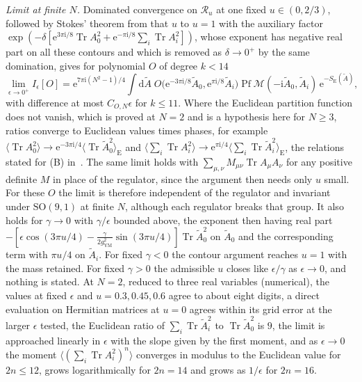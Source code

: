 \emph{Limit at finite \(N\).} Dominated convergence on \(\mathcal R_u\) at one fixed \(u\in(0,2/3)\), followed by Stokes' theorem from that \(u\) to \(u=1\) with the auxiliary factor \(\exp(-\delta[\mathrm e^{3\pi\mathrm i/8}\operatorname{Tr}A_0^2+\mathrm e^{-\pi\mathrm i/8}\sum_i\operatorname{Tr}A_i^2])\), whose exponent has negative real part on all these contours and which is removed as \(\delta\to0^+\) by the same domination, gives for polynomial \(O\) of degree \(k<14\)
\[
\lim_{\epsilon\to0^+}I_\epsilon[O]=\mathrm e^{7\pi\mathrm i(N^2-1)/4}\int\mathrm d\tilde A\;O\bigl(\mathrm e^{-3\pi\mathrm i/8}\tilde A_0,\mathrm e^{\pi\mathrm i/8}\tilde A_i\bigr)\operatorname{Pf}\mathcal M(-\mathrm i\tilde A_0,\tilde A_i)\,\mathrm e^{-S_{\mathrm E}(\tilde A)},
\]
with difference at most \(C_{O,N}\epsilon\) for \(k\le11\). Where the Euclidean partition function does not vanish, which is proved at \(N=2\) and is a hypothesis here for \(N\ge3\), ratios converge to Euclidean values times phases, for example \(\langle\operatorname{Tr}A_0^2\rangle\to\mathrm e^{-3\pi\mathrm i/4}\langle\operatorname{Tr}\tilde A_0^2\rangle_{\mathrm E}\) and \(\langle\sum_i\operatorname{Tr}A_i^2\rangle\to\mathrm e^{\pi\mathrm i/4}\langle\sum_i\operatorname{Tr}\tilde A_i^2\rangle_{\mathrm E}\), the relations stated for (B) in~\cite{Anagnostopoulos2026}. The same limit holds with \(\sum_{\mu,\nu}M_{\mu\nu}\operatorname{Tr}A_\mu A_\nu\) for any positive definite \(M\) in place of the regulator, since the argument then needs only \(u\) small. For these \(O\) the limit is therefore independent of the regulator and invariant under \(\mathrm{SO}(9,1)\) at finite \(N\), although each regulator breaks that group. It also holds for \(\gamma\to0\) with \(\gamma/\epsilon\) bounded above, the exponent then having real part \(-[\epsilon\cos(3\pi u/4)-\tfrac{\gamma}{2g_{\mathrm{YM}}^2}\sin(3\pi u/4)]\operatorname{Tr}\tilde A_0^2\) on \(\tilde A_0\) and the corresponding term with \(\pi u/4\) on \(\tilde A_i\). For fixed \(\gamma<0\) the contour argument reaches \(u=1\) with the mass retained. For fixed \(\gamma>0\) the admissible \(u\) closes like \(\epsilon/\gamma\) as \(\epsilon\to0\), and nothing is stated. At \(N=2\), reduced to three real variables (numerical), the values at fixed \(\epsilon\) and \(u=0.3,0.45,0.6\) agree to about eight digits, a direct evaluation on Hermitian matrices at \(u=0\) agrees within its grid error at the larger \(\epsilon\) tested, the Euclidean ratio of \(\sum_i\operatorname{Tr}\tilde A_i^2\) to \(\operatorname{Tr}\tilde A_0^2\) is \(9\), the limit is approached linearly in \(\epsilon\) with the slope given by the first moment, and as \(\epsilon\to0\) the moment \(\langle(\sum_i\operatorname{Tr}A_i^2)^{n}\rangle\) converges in modulus to the Euclidean value for \(2n\le12\), grows logarithmically for \(2n=14\) and grows as \(1/\epsilon\) for \(2n=16\).

